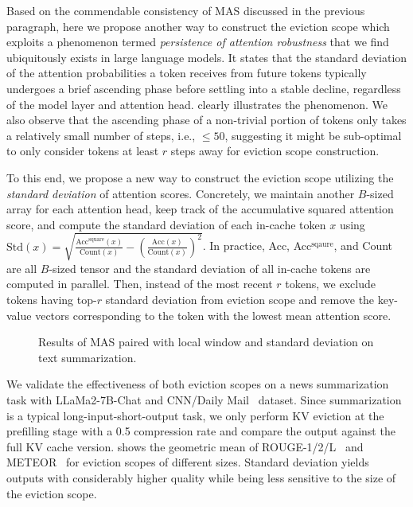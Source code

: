 Based on the commendable consistency of MAS discussed in the previous paragraph, here we propose another way to construct the eviction scope which exploits a phenomenon termed \textit{persistence of attention robustness} that we find ubiquitously exists in large language models.  
It states that the standard deviation of the attention probabilities a token receives 
from future tokens typically undergoes a brief ascending phase before settling into a stable 
decline, regardless of the model layer and attention head.  clearly illustrates the phenomenon. We also observe that the ascending phase of a non-trivial portion of tokens only takes a relatively small number of steps, i.e., $\leq 50$, suggesting it might be sub-optimal to only consider tokens at least $r$ steps away for eviction scope construction. 

To this end, we propose a new way to construct the eviction scope utilizing the \textit{standard deviation} of attention scores. Concretely, we maintain another $B$-sized array for each attention head, keep track of the accumulative squared attention score, and compute the standard deviation of each in-cache token $x$ using $\text{Std}(x)=\sqrt{\frac{\text{Acc}^{\text{square}}(x)}{\text{Count}(x)}-(\frac{\text{Acc}(x)}{\text{Count}(x)})^2}$. In practice, Acc, Acc$^{\text{sqaure}}$, and Count are all $B$-sized tensor and the standard deviation of all in-cache tokens are computed in parallel. Then, instead of the most recent $r$ tokens, we exclude tokens having top-$r$ standard deviation from eviction scope and remove the key-value vectors corresponding to the token with the lowest mean attention score. 

\begin{figure}[t]
	\centering
    \caption{Results of MAS paired with local window and standard deviation on text summarization.}
	\label{fig:scope}
\end{figure}
We validate the effectiveness of both eviction scopes on a news summarization task with LLaMa2-7B-Chat and CNN/Daily Mail~\cite{cnndm} dataset. Since summarization is a typical long-input-short-output task, we only perform KV eviction at the prefilling stage with a 0.5 compression rate and compare the output against the full KV cache version.  shows the geometric mean of ROUGE-1/2/L~\cite{rouge} and METEOR~\cite{meteor} for eviction scopes of different sizes. Standard deviation yields outputs with considerably higher quality while being less sensitive to the size of the eviction scope.

